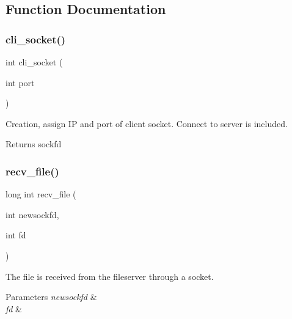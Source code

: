 \subsection{Function Documentation}
\mbox{\label{socket__client_8c_ad00c6fbc3ed7bc44f4e78ad434174830}} 
\subsubsection{cli\+\_\+socket()}
{\footnotesize\ttfamily int cli\+\_\+socket (\begin{DoxyParamCaption}\item[{int}]{port }\end{DoxyParamCaption})}



Creation, assign IP and port of client socket. Connect to server is included. 

\begin{DoxyReturn}{Returns}
sockfd 
\end{DoxyReturn}
\mbox{\label{socket__client_8c_a621d70c2ed3ab16e2bc0c9ec45b390ce}} 
\subsubsection{recv\+\_\+file()}
{\footnotesize\ttfamily long int recv\+\_\+file (\begin{DoxyParamCaption}\item[{int}]{newsockfd,  }\item[{int}]{fd }\end{DoxyParamCaption})}



The file is received from the fileserver through a socket. 


\begin{DoxyParams}{Parameters}
{\em newsockfd} & \\
\hline
{\em fd} & \\
\hline
\end{DoxyParams}
\mbox{\label{socket__client_8c_a0b59c96534746c30c167f090497a8dd0}} 
